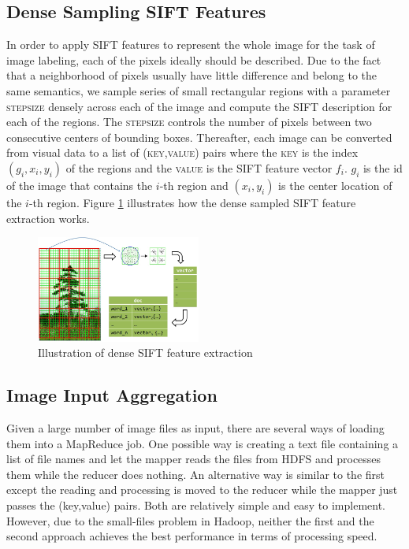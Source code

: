 \documentclass{acm_proc_article-sp}
\begin{document}
\subsection{Dense Sampling SIFT Features}
In order to apply SIFT features to represent the whole image for the task of image labeling, each of the pixels ideally should be described. Due to the fact that a neighborhood of pixels usually have little difference and belong to the same semantics, we sample series of small rectangular regions with a parameter \textsc{stepsize} densely across each of the image and compute the SIFT description for each of the regions. The \textsc{stepsize} controls the number of pixels between two consecutive centers of bounding boxes. Thereafter, each image can be converted from visual data to a list of \textsc{(key,value)} pairs where the \textsc{key} is the index $(g_i,x_i,y_i)$ of the regions and the \textsc{value} is the SIFT feature vector $f_i$. $g_i$ is the id of the image that contains the $i$-th region and $(x_i,y_i)$ is the center location of the $i$-th region. Figure \ref{fig:sift} illustrates how the dense sampled SIFT feature extraction works.
\begin{figure}[!htb]
\centering
\includegraphics[width=0.48\textwidth]{fig/sift-extract}
\caption{Illustration of dense SIFT feature extraction}\label{fig:sift}
\end{figure}

\subsection{Image Input Aggregation}
Given a large number of image files as input, there are several ways of loading them into a MapReduce job. One possible way is creating a text file containing a list of file names and let the mapper reads the files from HDFS and processes them while the reducer does nothing. An alternative way is similar to the first except the reading and processing is moved to the reducer while the mapper just passes the (key,value) pairs. Both are relatively simple and easy to implement. However, due to the small-files problem in Hadoop\cite{smallfiles}, neither the first and the second approach achieves the best performance in terms of processing speed. 
\end{document}
